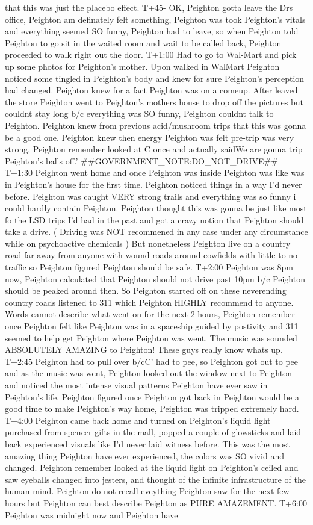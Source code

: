 \documentclass[12pt]{book}
\begin{document}
that this was just the placebo effect. T+45- OK, Peighton gotta leave the Drs office, Peighton am definately felt something, Peighton was took Peighton's vitals and everything seemed SO funny, Peighton had to leave, so when Peighton told Peighton to go sit in the waited room and wait to be called back, Peighton proceeded to walk right out the door. T+1:00 Had to go to Wal-Mart and pick up some photos for Peighton's mother. Upon walked in WalMart Peighton noticed some tingled in Peighton's body and knew for sure Peighton's perception had changed. Peighton knew for a fact Peighton was on a comeup. After leaved the store Peighton went to Peighton's mothers house to drop off the pictures but couldnt stay long b/c everything was SO funny, Peighton couldnt talk to Peighton. Peighton knew from previous acid/mushroom trips that this was gonna be a good one. Peighton knew then energy Peighton was felt pre-trip was very strong, Peighton remember looked at C once and actually saidWe are gonna trip Peighton's balls off.' \#\#GOVERNMENT\_NOTE:DO\_NOT\_DRIVE\#\# T+1:30 Peighton went home and once Peighton was inside Peighton was like was in Peighton's house for the first time. Peighton noticed things in a way I'd never before. Peighton was caught VERY strong trails and everything was so funny i could hardly contain Peighton. Peighton thought this was gonna be just like most fo the LSD trips I'd had in the past and got a crazy notion that Peighton should take a drive. ( Driving was NOT recommened in any case under any circumstance while on psychoactive chemicals ) But nonetheless Peighton live on a country road far away from anyone with wound roads around cowfields with little to no traffic so Peighton figured Peighton should be safe. T+2:00 Peighton was 8pm now, Peighton calculated that Peighton should not drive past 10pm b/c Peighton should be peaked around then. So Peighton started off on these neverending country roads listened to 311 which Peighton HIGHLY recommend to anyone. Words cannot describe what went on for the next 2 hours, Peighton remember once Peighton felt like Peighton was in a spaceship guided by postivity and 311 seemed to help get Peighton where Peighton was went. The music was sounded ABSOLUTELY AMAZING to Peighton! These guys really know whats up. T+2:45 Peighton had to pull over b/cC' had to pee, so Peighton got out to pee and as the music was went, Peighton looked out the window next to Peighton and noticed the most intense visual patterns Peighton have ever saw in Peighton's life. Peighton figured once Peighton got back in Peighton would be a good time to make Peighton's way home, Peighton was tripped extremely hard. T+4:00 Peighton came back home and turned on Peighton's liquid light purchased from spencer gifts in the mall, popped a couple of glowsticks and laid back experienced visuals like I'd never laid witness before. This was the most amazing thing Peighton have ever experienced, the colors was SO vivid and changed. Peighton remember looked at the liquid light on Peighton's ceiled and saw eyeballs changed into jesters, and thought of the infinite infrastructure of the human mind. Peighton do not recall eveything Peighton saw for the next few hours but Peighton can best describe Peighton as PURE AMAZEMENT. T+6:00 Peighton was midnight now and Peighton have 
\end{document}
